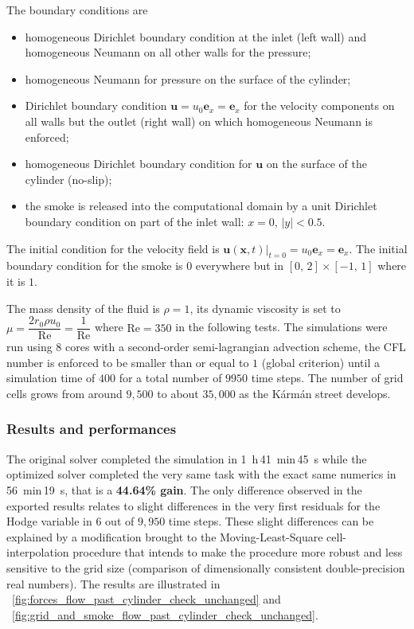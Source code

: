 \documentclass[11pt, a4paper]{article}
\newcommand{\fig}{\figurename \ }
\newcommand{\Reynolds}{\text{Re}}
\theoremstyle{remark}
\begin{document}
The boundary conditions are 
\begin{itemize}
 \item homogeneous Dirichlet boundary condition at the inlet (left wall) and homogeneous Neumann on all other walls for the pressure;
 \item homogeneous Neumann for pressure on the surface of the cylinder;
 \item Dirichlet boundary condition $\mathbf{u} = u_{0}\mathbf{e}_{x} = \mathbf{e}_{x}$ for the velocity components on all walls but the outlet (right wall) on which homogeneous Neumann is enforced;
 \item homogeneous Dirichlet boundary condition for $\mathbf{u}$ on the surface of the cylinder (no-slip);
 \item the smoke is released into the computational domain by a unit Dirichlet boundary condition on part of the inlet wall: $x = 0$, $\left| y\right| < 0.5$.
\end{itemize}
The initial condition for the velocity field is $\left.\mathbf{u}\left( \mathbf{x}, t\right)\right|_{t = 0} = u_{0}\mathbf{e}_{x} = \mathbf{e}_{x}$. The initial boundary condition for the smoke is $0$ everywhere but in $\left[0, \, 2 \right]\times \left[ -1, \, 1\right]$ where it is $1$.

The mass density of the fluid is $\rho = 1$, its dynamic viscosity is set to $\mu = \dfrac{2 r_{0}\rho u_{0}}{\Reynolds} = \dfrac{1}{\Reynolds}$ where $\Reynolds = 350$ in the following tests. The simulations were run using $8$ cores with a second-order semi-lagrangian advection scheme, the CFL number is enforced to be smaller than or equal to $1$ (global criterion) until a simulation time of $400$ for a total number of $9950$ time steps. The number of grid cells grows from around $9,500$ to about $35,000$ as the K\'{a}rm\'{a}n street develops. 

\subsubsection*{Results and performances}
The original solver completed the simulation in \SI{1}{\hour}\,\SI{41}{\minute}\,\SI{45}{\second} while the optimized solver completed the very same task with the exact same numerics in \SI{56}{\minute}\,\SI{19}{\second}, that is a \textbf{44.64\% gain}. The only difference observed in the exported results relates to slight differences in the very first residuals for the Hodge variable in $6$ out of $9,950$ time steps. These slight differences can be explained by a modification brought to the Moving-Least-Square cell-interpolation procedure that intends to make the procedure more robust and less sensitive to the grid size (comparison of dimensionally consistent double-precision real numbers). The results are illustrated in \fig \ref{fig:forces_flow_past_cylinder_check_unchanged} and \fig \ref{fig:grid_and_smoke_flow_past_cylinder_check_unchanged}.
\end{document}
